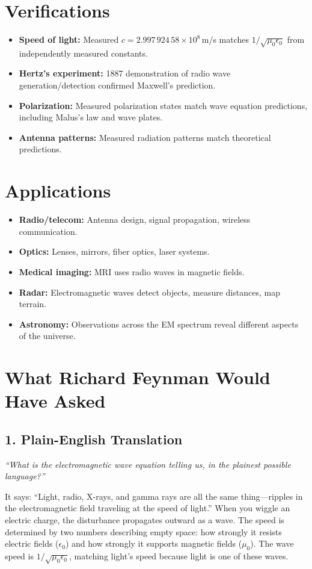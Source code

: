 \documentclass[11pt,openright]{book}
\begin{document}
\section*{Verifications}

\begin{itemize}
\item \textbf{Speed of light:} Measured $c = 2.997\,924\,58 \times 10^8$\,m/s matches $1/\sqrt{\mu_0 \epsilon_0}$ from independently measured constants.
\item \textbf{Hertz's experiment:} 1887 demonstration of radio wave generation/detection confirmed Maxwell's prediction.
\item \textbf{Polarization:} Measured polarization states match wave equation predictions, including Malus's law and wave plates.
\item \textbf{Antenna patterns:} Measured radiation patterns match theoretical predictions.
\end{itemize}
\section*{Applications}

\begin{itemize}
\item \textbf{Radio/telecom:} Antenna design, signal propagation, wireless communication.
\item \textbf{Optics:} Lenses, mirrors, fiber optics, laser systems.
\item \textbf{Medical imaging:} MRI uses radio waves in magnetic fields.
\item \textbf{Radar:} Electromagnetic waves detect objects, measure distances, map terrain.
\item \textbf{Astronomy:} Observations across the EM spectrum reveal different aspects of the universe.
\end{itemize}
\section*{What Richard Feynman Would Have Asked}

\subsection*{1. Plain-English Translation}
\textit{``What is the electromagnetic wave equation telling us, in the plainest possible language?''}

It says: ``Light, radio, X-rays, and gamma rays are all the same thing---ripples in the electromagnetic field traveling at the speed of light.'' When you wiggle an electric charge, the disturbance propagates outward as a wave. The speed is determined by two numbers describing empty space: how strongly it resists electric fields ($\epsilon_0$) and how strongly it supports magnetic fields ($\mu_0$). The wave speed is $1/\sqrt{\mu_0 \epsilon_0}$, matching light's speed because light is one of these waves.
\end{document}
